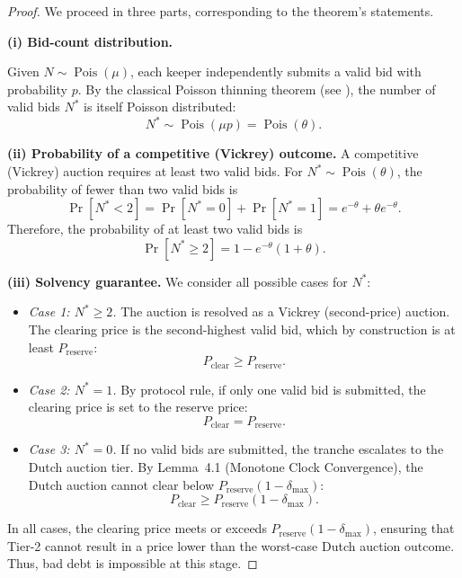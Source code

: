 \documentclass[11pt]{article}
\begin{document}
\begin{proof}
We proceed in three parts, corresponding to the theorem's statements.

\textbf{(i) Bid-count distribution.}  

Given $N \sim \operatorname{Pois}(\mu)$, each keeper independently submits a valid bid with probability $p$. By the classical Poisson thinning theorem (see \textcite[Thm.~5, §II.6]{feller1968}), the number of valid bids $N^*$ is itself Poisson distributed:
\[
    N^* \sim \operatorname{Pois}(\mu p) = \operatorname{Pois}(\theta).
\]

\textbf{(ii) Probability of a competitive (Vickrey) outcome.}  
A competitive (Vickrey) auction requires at least two valid bids. For $N^* \sim \operatorname{Pois}(\theta)$, the probability of fewer than two valid bids is
\[
    \Pr[N^* < 2] = \Pr[N^* = 0] + \Pr[N^* = 1] = e^{-\theta} + \theta e^{-\theta}.
\]
Therefore, the probability of at least two valid bids is
\[
    \Pr[N^* \geq 2] = 1 - e^{-\theta}(1 + \theta).
\]

\textbf{(iii) Solvency guarantee.}  
We consider all possible cases for $N^*$:
\begin{itemize}
    \item \emph{Case 1: $N^* \geq 2$.}  
        The auction is resolved as a Vickrey (second-price) auction. The clearing price is the second-highest valid bid, which by construction is at least $P_{\mathrm{reserve}}$:
        \[
            P_{\mathrm{clear}} \geq P_{\mathrm{reserve}}.
        \]
    \item \emph{Case 2: $N^* = 1$.}  
        By protocol rule, if only one valid bid is submitted, the clearing price is set to the reserve price:
        \[
            P_{\mathrm{clear}} = P_{\mathrm{reserve}}.
        \]
    \item \emph{Case 3: $N^* = 0$.}  
        If no valid bids are submitted, the tranche escalates to the Dutch auction tier. By Lemma~4.1 (Monotone Clock Convergence), the Dutch auction cannot clear below $P_{\mathrm{reserve}}(1-\delta_{\max})$:
        \[
            P_{\mathrm{clear}} \geq P_{\mathrm{reserve}}(1 - \delta_{\max}).
        \]
\end{itemize}
In all cases, the clearing price meets or exceeds $P_{\mathrm{reserve}}(1 - \delta_{\max})$, ensuring that Tier-2 cannot result in a price lower than the worst-case Dutch auction outcome. Thus, bad debt is impossible at this stage.
\end{proof}

\clearpage
\end{document}

